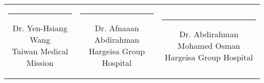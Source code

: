 \documentclass[a4paper, landscape]{article}
\begin{document}
\begin{center}
\large
\begin{center}
\begin{tabular}{ccc}
\parbox[t]{6cm}{\centering\vspace{2cm}\hrule\vspace{1mm}\centering Dr. Yen-Hsiang Wang\\Taiwan Medical Mission} &
\parbox[t]{6cm}{\centering\vspace{2cm}\hrule\vspace{1mm}\centering Dr. Afnaaan Abdirahman\\Hargeisa Group Hospital} &
\parbox[t]{8cm}{\centering\vspace{2cm}\hrule\vspace{1mm}\centering Dr. Abdirahman Mohamed Osman\\Hargeisa Group Hospital} \\[1cm]
\end{tabular}
\end{center}

\end{center}



\clearpage
\end{document}
